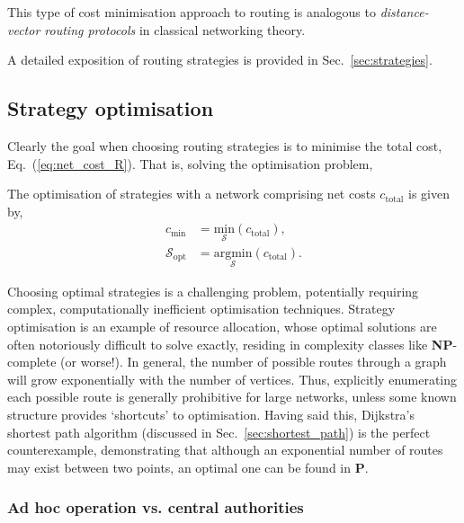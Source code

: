 This type of cost minimisation approach to routing is analogous to \textit{distance-vector routing protocols} in classical networking theory.

A detailed exposition of routing strategies is provided in Sec.~\ref{sec:strategies}.

%
%

\subsection{Strategy optimisation} \label{sec:strat_opt}  

Clearly the goal when choosing routing strategies is to minimise the total cost, Eq.~(\ref{eq:net_cost_R}). That is, solving the optimisation problem,
\begin{definition}
The optimisation of strategies with a network comprising net costs $c_\mathrm{total}$ is given by,
\begin{align}
c_\mathrm{min} &= \underset{\mathcal{S}}{\mathrm{min}}(c_\mathrm{total}), \nonumber \\
\mathcal{S}_\mathrm{opt} &= \underset{\mathcal{S}}{\mathrm{argmin}} (c_\mathrm{total}).
\end{align}
\end{definition}

Choosing optimal strategies is a challenging problem, potentially requiring complex, computationally inefficient optimisation techniques. Strategy optimisation is an example of resource allocation, whose optimal solutions are often notoriously difficult to solve exactly, residing in complexity classes like \textbf{NP}-complete (or worse!). In general, the number of possible routes through a graph will grow exponentially with the number of vertices. Thus, explicitly enumerating each possible route is generally prohibitive for large networks, unless some known structure provides `shortcuts' to optimisation. Having said this, Dijkstra's shortest path algorithm (discussed in Sec.~\ref{sec:shortest_path}) is the perfect counterexample, demonstrating that although an exponential number of routes may exist between two points, an optimal one can be found in \textbf{P}.

%
%

\subsubsection{Ad hoc operation vs. central authorities}  

